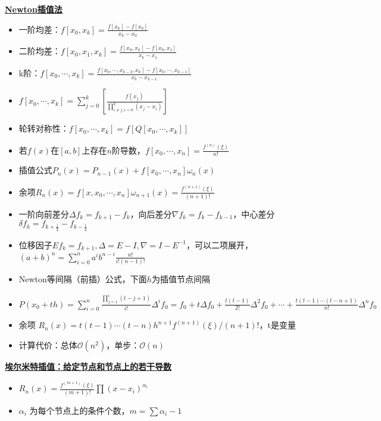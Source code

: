\documentclass[UTF8,a4paper,landscape,8pt]{paper}
\renewcommand{\subsection}[1]{{\small\textbf{\underline{#1}}}\\ }
\newcommand{\List}[1]{\begin{itemize}[fullwidth,itemindent=0em] #1 \end{itemize}}
\begin{document}
\begin{multicols}{4}
    \subsection{Newton插值法}
    \List{
        \item {一阶均差：$f[x_0,x_k] = \frac{f[x_k] - f[x_0]}{x_k-x_0}$}
        \item {二阶均差：$f[x_0,x_1,x_k] = \frac{f[x_0,x_k] - f[x_0,x_1]}{x_k-x_1}$}
        \item {k阶：$f[x_0,\cdots, x_k] = \frac{f[x_0,\cdots,x_{k-2},x_k] - f[x_0,\cdots, x_{k-1}]}
        {x_k-x_{k-1}}$}
        \item {$f[x_0,\cdots,x_k] = \sum^k_{j=0}[\frac{f(x_j)}{\prod^k_{i\ne j,i=0}(x_j-x_i)}]$}
        \item {轮转对称性：$f[x_0,\cdots,x_k] = f[Q[x_0,\cdots,x_k]]$}
        \item {若$f(x)$在$[a,b]$上存在$n$阶导数，$f[x_0,\cdots,x_n]=\frac{f^{(n)}(\xi)}{n!}$}
        \item {插值公式$P_n(x) = P_{n-1}(x) + f[x_0,\cdots,x_n] \omega_n(x)$}
        \item {余项$R_n(x) = f[x,x_0,\cdots,x_n]\omega_{n+1}(x) = \frac{f^{(n+1)}(\xi)}{(n+1)!}$}
        \item {一阶向前差分$\Delta f_k = f_{k+1} - f_k$，向后差分$\nabla f_k = f_k - f_{k-1}$，中心差分$\delta f_k = f_{k+\frac{1}{2}} - f_{k-\frac{1}{2}}$}
        \item {位移因子$Ef_k=f_{k+1}, \Delta = E - I, \nabla = I - E^{-1}$，可以二项展开，$(a+b)^n = \sum_{i=0}^n a^i b^{n-i} \frac{n!}{i!(n-1)!}$}
        \item {Newton等间隔（前插）公式，下面$h$为插值节点间隔}
        \item {$P(x_0+th) = \sum_{i=0}^n\frac{\prod_{j=1}^i(t-j+1)}{i!}\Delta^if_0 = f_0 + t\Delta f_0 + \frac{t(t-1)}{2!}\Delta^2f_0 + \cdots + \frac{t(t-1)\cdots(t-n+1)}{n!}\Delta^nf_0$ }
        \item {余项 $R_n(x) = t(t-1)\cdots(t-n)h^{n+1}f^{(n+1)}(\xi)/(n+1)!$，t是变量}
		\item {计算代价：总体$\mathcal O(n^2)$，单步：$\mathcal O(n)$}
        }
    \subsection{埃尔米特插值：给定节点和节点上的若干导数}
    \List{
        \item {$R_n(x) = \frac{f^{(m+1)}(\xi)}{(m+1)!}\prod(x-x_i)^{\alpha_i}$}
        \item {$\alpha_i$ 为每个节点上的条件个数，$m = \sum \alpha_i - 1$}
    }

\end{multicols}
\end{document}
